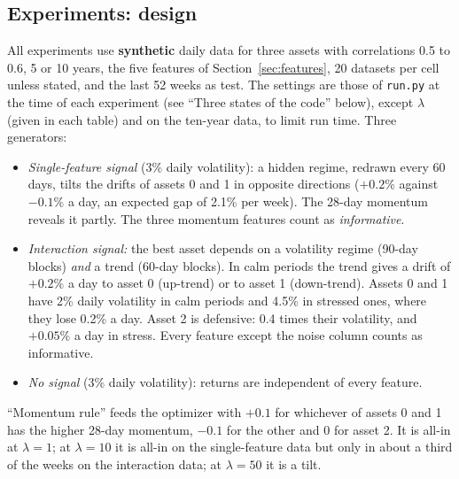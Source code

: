 \documentclass[11pt,a4paper]{article}
\newcommand{\1}{\mathbf{1}}
\newcommand{\code}[1]{\texttt{\detokenize{#1}}}
\begin{document}
\subsection{Experiments: design}
All experiments use \textbf{synthetic} daily data for three assets with correlations 0.5 to 0.6, 5 or 10 years, the five features of Section~\ref{sec:features}, 20 datasets per cell unless stated, and the last 52 weeks as test. The settings are those of \texttt{run.py} at the time of each experiment (see ``Three states of the code'' below), except $\lambda$ (given in each table) and \code{max_thresholds=100} on the ten-year data, to limit run time. Three generators:
\begin{itemize}
\item \emph{Single-feature signal} (3\% daily volatility): a hidden regime, redrawn every 60 days, tilts the drifts of assets 0 and 1 in opposite directions ($+0.2\%$ against $-0.1\%$ a day, an expected gap of 2.1\% per week). The 28-day momentum reveals it partly. The three momentum features count as \emph{informative}.
\item \emph{Interaction signal:} the best asset depends on a volatility regime (90-day blocks) \emph{and} a trend (60-day blocks). In calm periods the trend gives a drift of $+0.2\%$ a day to asset 0 (up-trend) or to asset 1 (down-trend). Assets 0 and 1 have 2\% daily volatility in calm periods and 4.5\% in stressed ones, where they lose 0.2\% a day. Asset 2 is defensive: 0.4 times their volatility, and $+0.05\%$ a day in stress. Every feature except the noise column counts as informative.
\item \emph{No signal} (3\% daily volatility): returns are independent of every feature.
\end{itemize}
``Momentum rule'' feeds the optimizer with $+0.1$ for whichever of assets 0 and 1 has the higher 28-day momentum, $-0.1$ for the other and 0 for asset 2. It is all-in at $\lambda=1$; at $\lambda=10$ it is all-in on the single-feature data but only in about a third of the weeks on the interaction data; at $\lambda=50$ it is a tilt.
\end{document}

